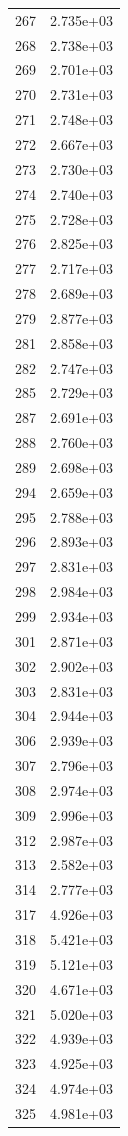 \documentclass[12pt]{article}
\begin{document}
\begin{longtable}{@{}cc@{}}
267 & 2.735e+03 \\
268 & 2.738e+03 \\
269 & 2.701e+03 \\
270 & 2.731e+03 \\
271 & 2.748e+03 \\
272 & 2.667e+03 \\
273 & 2.730e+03 \\
274 & 2.740e+03 \\
275 & 2.728e+03 \\
276 & 2.825e+03 \\
277 & 2.717e+03 \\
278 & 2.689e+03 \\
279 & 2.877e+03 \\
281 & 2.858e+03 \\
282 & 2.747e+03 \\
285 & 2.729e+03 \\
287 & 2.691e+03 \\
288 & 2.760e+03 \\
289 & 2.698e+03 \\
294 & 2.659e+03 \\
295 & 2.788e+03 \\
296 & 2.893e+03 \\
297 & 2.831e+03 \\
298 & 2.984e+03 \\
299 & 2.934e+03 \\
301 & 2.871e+03 \\
302 & 2.902e+03 \\
303 & 2.831e+03 \\
304 & 2.944e+03 \\
306 & 2.939e+03 \\
307 & 2.796e+03 \\
308 & 2.974e+03 \\
309 & 2.996e+03 \\
312 & 2.987e+03 \\
313 & 2.582e+03 \\
314 & 2.777e+03 \\
317 & 4.926e+03 \\
318 & 5.421e+03 \\
319 & 5.121e+03 \\
320 & 4.671e+03 \\
321 & 5.020e+03 \\
322 & 4.939e+03 \\
323 & 4.925e+03 \\
324 & 4.974e+03 \\
325 & 4.981e+03 \\

\end{longtable}
\end{document}
